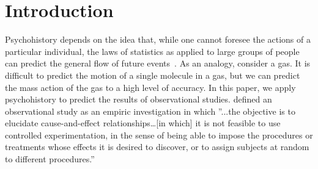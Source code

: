 
\section{Introduction}

Psychohistory depends on the idea that, while one cannot foresee the
actions of a particular individual, the laws of statistics as applied
to large groups of people can predict the general flow of future
events~\citep{asimov1951}.  As an analogy, consider a gas.  It is
difficult to predict the motion of a single molecule in a gas, but we
can predict the mass action of the gas to a high level of accuracy.
In this paper, we apply psychohistory to predict the results of
observational studies.  \citet{cochran1965} defined an observational
study as an empiric investigation in which ''...the objective is to
elucidate cause-and-effect relationships…[in which] it is not feasible
to use controlled experimentation, in the sense of being able to
impose the procedures or treatments whose effects it is desired to
discover, or to assign subjects at random to different procedures.''


